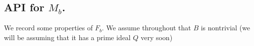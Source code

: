 \subsection{API for $M_b$.}

We record some properties of $F_b$. We assume throughout
that $B$ is nontrivial (we will be assuming that it
has a prime ideal $Q$ very soon)


